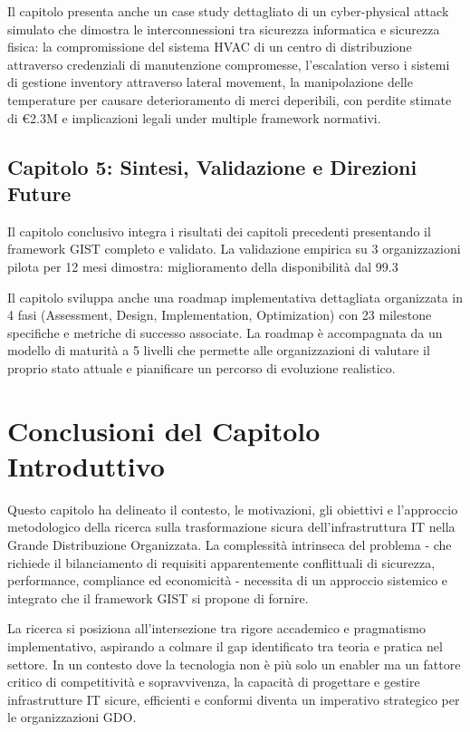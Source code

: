 Il capitolo presenta anche un case study dettagliato di un cyber-physical attack simulato che dimostra le interconnessioni tra sicurezza informatica e sicurezza fisica: la compromissione del sistema HVAC di un centro di distribuzione attraverso credenziali di manutenzione compromesse, l'escalation verso i sistemi di gestione inventory attraverso lateral movement, la manipolazione delle temperature per causare deterioramento di merci deperibili, con perdite stimate di €2.3M e implicazioni legali under multiple framework normativi.

\subsection{Capitolo 5: Sintesi, Validazione e Direzioni Future}

Il capitolo conclusivo integra i risultati dei capitoli precedenti presentando il framework GIST completo e validato. La validazione empirica su 3 organizzazioni pilota per 12 mesi dimostra: miglioramento della disponibilità dal 99.3%

Il capitolo sviluppa anche una roadmap implementativa dettagliata organizzata in 4 fasi (Assessment, Design, Implementation, Optimization) con 23 milestone specifiche e metriche di successo associate. La roadmap è accompagnata da un modello di maturità a 5 livelli che permette alle organizzazioni di valutare il proprio stato attuale e pianificare un percorso di evoluzione realistico.

\section{Conclusioni del Capitolo Introduttivo}

Questo capitolo ha delineato il contesto, le motivazioni, gli obiettivi e l'approccio metodologico della ricerca sulla trasformazione sicura dell'infrastruttura IT nella Grande Distribuzione Organizzata. La complessità intrinseca del problema - che richiede il bilanciamento di requisiti apparentemente conflittuali di sicurezza, performance, compliance ed economicità - necessita di un approccio sistemico e integrato che il framework GIST si propone di fornire.

La ricerca si posiziona all'intersezione tra rigore accademico e pragmatismo implementativo, aspirando a colmare il gap identificato tra teoria e pratica nel settore. In un contesto dove la tecnologia non è più solo un enabler ma un fattore critico di competitività e sopravvivenza, la capacità di progettare e gestire infrastrutture IT sicure, efficienti e conformi diventa un imperativo strategico per le organizzazioni GDO.

